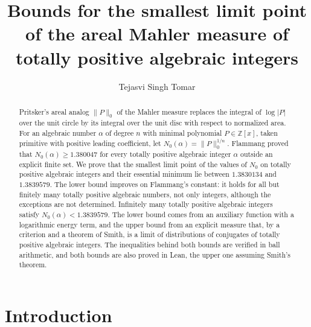 \documentclass[11pt]{amsart}
\theoremstyle{remark}
\numberwithin{equation}{section}
\newcommand{\Z}{\mathbb{Z}}
\newcommand{\LB}{1.3830134}
\newcommand{\UB}{1.3839579}
\newcommand{\FlamVal}{1.380047}
\begin{document}
\title[The areal Mahler measure of totally positive algebraic integers]{Bounds for the smallest limit point of the areal Mahler measure of totally positive algebraic integers}
\author{Tejasvi Singh Tomar}
\renewcommand{\urladdrname}{{\itshape ORCID}}

\begin{abstract}
Pritsker's areal analog $\|P\|_0$ of the Mahler measure replaces the integral of $\log|P|$ over the unit circle by its integral over the unit disc with respect to normalized area. For an algebraic number $\alpha$ of degree $n$ with minimal polynomial $P\in\Z[x]$, taken primitive with positive leading coefficient, let $N_0(\alpha)=\|P\|_0^{1/n}$. Flammang proved that $N_0(\alpha)\ge\FlamVal$ for every totally positive algebraic integer $\alpha$ outside an explicit finite set. We prove that the smallest limit point of the values of $N_0$ on totally positive algebraic integers and their essential minimum lie between $\LB$ and $\UB$. The lower bound improves on Flammang's constant: it holds for all but finitely many totally positive algebraic numbers, not only integers, although the exceptions are not determined. Infinitely many totally positive algebraic integers satisfy $N_0(\alpha)<\UB$. The lower bound comes from an auxiliary function with a logarithmic energy term, and the upper bound from an explicit measure that, by a criterion and a theorem of Smith, is a limit of distributions of conjugates of totally positive algebraic integers. The inequalities behind both bounds are verified in ball arithmetic, and both bounds are also proved in Lean, the upper one assuming Smith's theorem.
\end{abstract}

\maketitle

\section{Introduction}\label{sec:intro}
\end{document}

